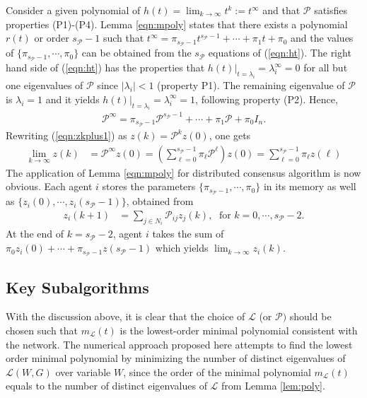 \documentclass[onecolumn,reviewcopy]{autart}
\def \L{\mathcal{L}}
\def \P{\mathcal{P}}
\begin{document}
Consider a given polynomial of $h(t)=\lim_{k \rightarrow \infty} t^{k}:=t^{\infty}$ and that $\P$ satisfies properties (P1)-(P4).
Lemma \ref{eqn:mpoly} states that there exists a polynomial $r(t)$ or order $s_\P-1$ such that
$t^{\infty}=\pi_{s_\P-1}t^{s_\P-1}+\cdots + \pi_{1}t+\pi_0$ and the values of $\{\pi_{s_\P-1},\cdots, \pi_0\}$ can be obtained from the $s_\P$ equations of (\ref{eqn:ht}). The right hand side of (\ref{eqn:ht}) has the properties that $h(t)|_{t=\lambda_i}=\lambda_i^{\infty}=0$
for all but one eigenvalues of $\P$ since $|\lambda_i|<1$ (property P1). The remaining eigenvalue of $\P$ is $\lambda_i=1$ and it yields $h(t)|_{t=\lambda_i}=\lambda_i^{\infty}=1$, following property (P2). Hence,
\begin{align} \label{eqn:W}
\P^{\infty}=\pi_{s_\P-1}\P^{s_\P-1}+\cdots + \pi_{1}\P+\pi_0 I_n.
\end{align}
Rewriting (\ref{eqn:zkplus1}) as $z(k)=\P^{k}z(0)$, one gets
\begin{align}
\lim_{k \rightarrow \infty} z(k) &=  \P^{\infty}z(0)=( \sum\limits_{\ell=0}^{s_\P-1} \pi_{\ell} \P^{\ell})z(0)= \sum\limits_{\ell=0}^{s_\P-1} \pi_{\ell}z(\ell) \label{eqn:sumtoT}
\end{align}
The application of Lemma \ref{eqn:mpoly} for distributed consensus algorithm is now obvious. Each agent $i$ stores the parameters $\{\pi_{s_\P-1},\cdots, \pi_0\}$ in its memory as well as $\{z_i(0), \cdots, z_i(s_\P-1)\}$, obtained from
\begin{align}
z_i(k+1)&=\sum_{j \in N_i} \P_{ij} z_j(k), \;  \textrm{ for } k=0,\cdots, s_\P-2. \nonumber
\end{align}
At the end of $k=s_\P -2$, agent $i$ takes the sum of $\pi_0 z_i(0) + \cdots + \pi_{s_{\P}-1} z(s_{\P}-1)$  which yields $\lim_{k \rightarrow \infty} z_i(k)$.

\subsection{Key Subalgorithms}
With the discussion above, it is clear that the choice of $\L$ (or $\P)$ should be chosen such that $m_{\L}(t)$ is the lowest-order minimal polynomial consistent with the network.  The numerical approach proposed here attempts to find the lowest order minimal polynomial by minimizing the number of distinct eigenvalues of $\L(W,G)$ over variable $W$, since the order of the minimal polynomial $m_{\L}(t)$ equals to the number of distinct eigenvalues of $\L$ from Lemma \ref{lem:poly}.
\end{document}
